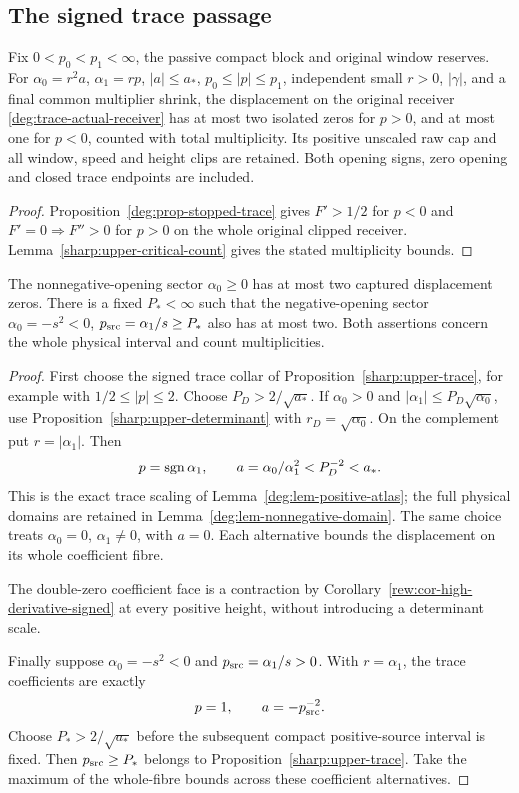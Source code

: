 \subsection{The signed trace passage}

\begin{proposition}\label{sharp:upper-trace}
Fix \(0<p_0<p_1<\infty\), the passive compact block and original
window reserves. For \(\alpha_0=r^2a\), \(\alpha_1=rp\),
\(|a|\le a_*\), \(p_0\le|p|\le p_1\), independent small
\(r>0\), \(|\gamma|\), and a final common multiplier shrink,
the displacement on the original receiver
\eqref{deg:trace-actual-receiver} has at most two isolated zeros for
\(p>0\), and at most one for \(p<0\), counted with total multiplicity.
Its positive unscaled raw cap and all window, speed and height clips
are retained. Both opening signs, zero opening and closed trace endpoints
are included.
\end{proposition}

\begin{proof}
Proposition~\ref{deg:prop-stopped-trace} gives \(F'>1/2\) for
\(p<0\) and \(F'=0\Rightarrow F''>0\) for \(p>0\) on the whole
original clipped receiver. Lemma~\ref{sharp:upper-critical-count}
gives the stated multiplicity bounds.
\end{proof}

\begin{corollary}\label{sharp:upper-local-coefficient-ranges}
The nonnegative-opening sector \(\alpha_0\ge0\) has at most
two captured displacement zeros. There is a fixed \(P_*<\infty\)
such that the negative-opening sector
\(\alpha_0=-s^2<0\), \(p_{\rm src}=\alpha_1/s\ge P_*\)
also has at most two. Both assertions concern the whole physical
interval and count multiplicities.
\end{corollary}

\begin{proof}
First choose the signed trace collar of
Proposition~\ref{sharp:upper-trace}, for example with
\(1/2\le|p|\le2\). Choose \(P_D>2/\sqrt{a_*}\).
If \(\alpha_0>0\) and
\(|\alpha_1|\le P_D\sqrt{\alpha_0}\), use
Proposition~\ref{sharp:upper-determinant} with
\(r_D=\sqrt{\alpha_0}\). On the complement put
\(r=|\alpha_1|\). Then
\[
 p=\operatorname{sgn}\alpha_1,\qquad
 a=\alpha_0/\alpha_1^2<P_D^{-2}<a_*.
\]
This is the exact trace scaling of
Lemma~\ref{deg:lem-positive-atlas}; the full physical domains are
retained in Lemma~\ref{deg:lem-nonnegative-domain}. The same choice treats
\(\alpha_0=0\), \(\alpha_1\ne0\), with \(a=0\).
Each alternative bounds the displacement on its whole coefficient fibre.

The double-zero coefficient face is a contraction by
Corollary~\ref{rew:cor-high-derivative-signed} at every positive
height, without introducing a determinant scale.

Finally suppose \(\alpha_0=-s^2<0\) and
\(p_{\rm src}=\alpha_1/s>0\). With \(r=\alpha_1\), the
trace coefficients are exactly
\[
 p=1,\qquad a=-p_{\rm src}^{-2}.
\]
Choose \(P_*>2/\sqrt{a_*}\) before the subsequent compact
positive-source interval is fixed. Then
\(p_{\rm src}\ge P_*\) belongs to
Proposition~\ref{sharp:upper-trace}. Take the maximum of the
whole-fibre bounds across these coefficient alternatives.
\end{proof}
